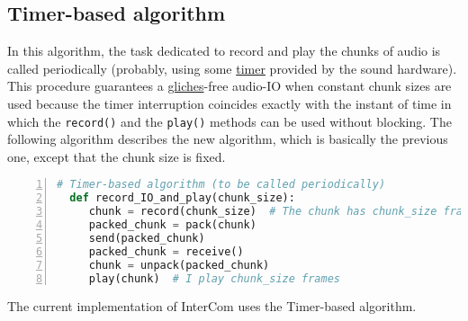 \subsection{Timer-based algorithm}

In this algorithm, the task dedicated to record and play the chunks of
audio is called periodically (probably, using some
\href{https://en.wikipedia.org/wiki/Timer}{timer} provided by the
sound hardware). This procedure guarantees a
\href{https://en.wikipedia.org/wiki/Glitch}{gliches}-free audio-IO
when constant chunk sizes are used because the timer interruption
coincides exactly with the instant of time in which the
\verb|record()| and the \verb|play()| methods can be used without
blocking. The following algorithm describes the new algorithm, which
is basically the previous one, except that the chunk size is fixed.

\begin{lstlisting}[language=Python,numbers=left]
  # Timer-based algorithm (to be called periodically)
  def record_IO_and_play(chunk_size):
     chunk = record(chunk_size)  # The chunk has chunk_size frames
     packed_chunk = pack(chunk)
     send(packed_chunk)
     packed_chunk = receive()
     chunk = unpack(packed_chunk)
     play(chunk)  # I play chunk_size frames
\end{lstlisting}


The current implementation of InterCom uses the Timer-based algorithm.

